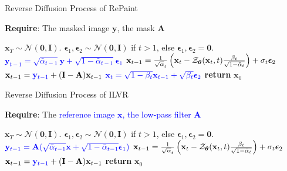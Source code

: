\documentclass{article} \usepackage{iclr2023_conference,times}
\begin{document}
\begin{algorithm}\caption{Reverse Diffusion Process of RePaint}
\label{alg:repaint}
\textbf{Require}: The masked image $\mathbf{y}$, the mask $\mathbf{A}$
\begin{algorithmic}[1] \State $\mathbf{x}_{T}\sim\mathcal{N}(\mathbf{0},\mathbf{I})$.
\State $\boldsymbol{\epsilon}_{1},\boldsymbol{\epsilon}_{2}\sim\mathcal{N}(\mathbf{0},\mathbf{I})$ if $t>1$, else $\boldsymbol{\epsilon}_{1},\boldsymbol{\epsilon}_{2}=\mathbf{0}$.
\State \textcolor{blue}{$\mathbf{y}_{t-1} = \sqrt{\bar{\alpha}_{t-1}}\mathbf{y}+\sqrt{1-\bar{\alpha}_{t-1}}\boldsymbol{\epsilon}_{1}$}
\label{alg:repaint yt}
\State $\mathbf{x}_{t-1} = \frac{1}{\sqrt{\alpha}_{t}}	\left( \mathbf{x}_{t} - \mathcal{Z}_{\boldsymbol{\theta}}(\mathbf{x}_{t},t)\frac{\beta_{t}}{\sqrt{1-\Bar{\alpha}_{t}}} \right) +\sigma_{t}\boldsymbol{\epsilon}_{2}$
\State $\mathbf{x}_{t-1} = \textcolor{blue}{\mathbf{y}_{t-1}} + (\mathbf{I} -\mathbf{A})\mathbf{x}_{t-1}$
\label{alg:repaint rnd}
\State $\textcolor{blue}{\mathbf{x}_{t} = \sqrt{1-\beta_{t}}\mathbf{x}_{t-1}+\sqrt{\beta_{t}}\boldsymbol{\epsilon}_{2}}$
\label{alg:repaint loop}
\EndIf
\EndFor
\EndFor
\State \textbf{return} $\mathbf{x}_{0}$
\end{algorithmic}
\end{algorithm}



\begin{algorithm}\caption{Reverse Diffusion Process of ILVR}
\label{alg:ilvr}
\textbf{Require}: The \textcolor{blue}{reference image $\mathbf{x}$, the low-pass filter $\mathbf{A}$}
\begin{algorithmic}[1] \State $\mathbf{x}_{T}\sim\mathcal{N}(\mathbf{0},\mathbf{I})$.
\State $\boldsymbol{\epsilon}_{1},\boldsymbol{\epsilon}_{2}\sim\mathcal{N}(\mathbf{0},\mathbf{I})$ if $t>1$, else $\boldsymbol{\epsilon}_{1},\boldsymbol{\epsilon}_{2}=\mathbf{0}$.
\State $\textcolor{blue}{\mathbf{y}_{t-1} =\mathbf{A}( \sqrt{\bar{\alpha}_{t-1}}\mathbf{x}+\sqrt{1-\bar{\alpha}_{t-1}}\boldsymbol{\epsilon}_{1})}$
\label{alg:ilvr xt}
\State $\mathbf{x}_{t-1} = \frac{1}{\sqrt{\alpha}_{t}}	\left( \mathbf{x}_{t} - \mathcal{Z}_{\boldsymbol{\theta}}(\mathbf{x}_{t},t)\frac{\beta_{t}}{\sqrt{1-\Bar{\alpha}_{t}}} \right) +\sigma_{t}\boldsymbol{\epsilon}_{2}$
\State $\mathbf{x}_{t-1} = \textcolor{blue}{\mathbf{y}_{t-1}} + (\mathbf{I} - \mathbf{A})\mathbf{x}_{t-1}$
\label{alg:ilvr rnd}
\EndFor
\State \textbf{return} $\mathbf{x}_{0}$
\end{algorithmic}
\end{algorithm}
\end{document}
